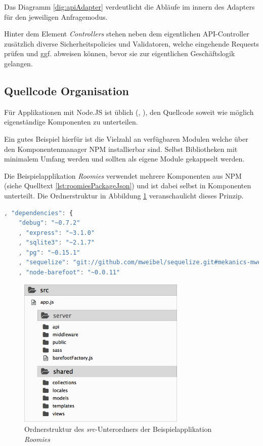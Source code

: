 Das Diagramm \ref{dig:apiAdapter} verdeutlicht die Abläufe im innern des Adapters für den jeweiligen Anfragemodus.

Hinter dem Element \emph{Controllers} stehen neben dem eigentlichen API-Controller zusätzlich diverse Sicherheitspolicies und Validatoren, welche eingehende Requests prüfen und ggf. abweisen können, bevor sie zur eigentlichen Geschäftslogik gelangen.




\subsection{Quellcode Organisation}
Für Applikationen mit Node.JS ist üblich (\cite{TJH_ComponentStructure}, \cite{IZS_ComponentStructure}), den Quellcode soweit wie möglich eigenständige Komponenten zu unterteilen.

Ein gutes Beispiel hierfür ist die Vielzahl an verfügbaren Modulen welche über den Komponentenmanager NPM \cite{NPM} installierbar sind. Selbst Bibliotheken mit minimalem Umfang werden und sollten als eigene Module gekappselt werden.

Die Beispielapplikation \emph{Roomies} verwendet mehrere Komponenten aus NPM (siehe Quelltext \ref{lst:roomiesPackageJson}) und ist dabei selbst in Komponenten unterteilt. Die Ordnerstruktur in Abbildung \ref{fig:roomiesFolderStructure} veranschaulicht dieses Prinzip.

\begin{lstlisting}[language=JavaScript, firstnumber=9, caption={Auszug der verwendeten NPM Komponenten \cite{RoomiesPackageJson}}, label={lst:roomiesPackageJson}, float=ht!]
, "dependencies": {
	"debug": "~0.7.2"
	, "express": "~3.1.0"
	, "sqlite3": "~2.1.7"
	, "pg": "~0.15.1"
	, "sequelize": "git://github.com/mweibel/sequelize.git#mekanics-mweibel-fix"
	, "node-barefoot": "~0.0.11"
\end{lstlisting}

\begin{figure}[H]
	\centering
	\includegraphics[width=8cm]{content/sad/images/folder-structure.png}
	\caption{Ordnerstruktur des \emph{src}-Unterordners der Beispielapplikation \emph{Roomies}}
	\label{fig:roomiesFolderStructure}
\end{figure}

